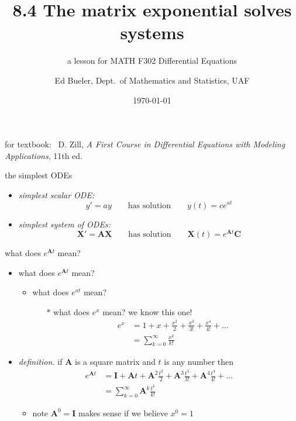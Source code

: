 \documentclass[urlcolor=blue,dvipsnames]{beamer}
\title{8.4 The matrix exponential solves systems}
\subtitle{a lesson for MATH F302 Differential Equations}
\author{Ed Bueler, Dept.~of Mathematics and Statistics, UAF}
\date{\tiny \today}
\newcommand{\bA}{\mathbf{A}}
\newcommand{\bC}{\mathbf{C}}
\newcommand{\bI}{\mathbf{I}}
\newcommand{\bX}{\mathbf{X}}
\begin{document}
\renewcommand{\thefootnote}{{\color{green} \arabic{footnote}}}

\begin{frame}
\titlepage

\centerline{\tiny for textbook: \, D. Zill, \emph{A First Course in Differential Equations with Modeling Applications}, 11th ed.}
\end{frame}


\begin{frame}{the simplest ODEs}

\begin{itemize}
\item \emph{simplest scalar ODE:}
    $$y'=ay \qquad \text{has solution} \qquad y(t) = c e^{at}$$

\bigskip
\item \emph{simplest system of ODEs:}
    $$\bX'=\bA \bX \qquad \text{has solution} \qquad \bX(t) = e^{\bA t}\bC$$
\end{itemize}
\end{frame}


\begin{frame}{what does $e^{\bA t}$ mean?}

\begin{itemize}
\item what does $e^{\bA t}$ mean?
   \begin{itemize}
   \item what does $e^{at}$ mean?
       \begin{itemize}
       \item[$\ast$] what does $e^x$ mean?  \alert{we know this one!}
\begin{align*}
e^x &= 1 + x + \frac{x^2}{2} + \frac{x^3}{3!} + \frac{x^4}{4!} + \dots \\
    &= \sum_{k=0}^\infty \frac{x^k}{k!}
\end{align*}
       \end{itemize}
   \end{itemize}

\medskip
\item \emph{definition.} if $\bA$ is a square matrix and $t$ is any number then
\begin{align*}
e^{\bA t} &= \bI + \bA t + \bA^2 \frac{t^2}{2} + \bA^3 \frac{t^3}{3!} + \bA^4 \frac{t^4}{4!} + \dots \\
    &= \sum_{k=0}^\infty \bA^k \frac{t^k}{k!}
\end{align*}
   \begin{itemize}
   \item note $\bA^0 = \bI$ makes sense if we believe $x^0=1$
   \end{itemize}
\end{itemize}
\end{frame}
\end{document}
